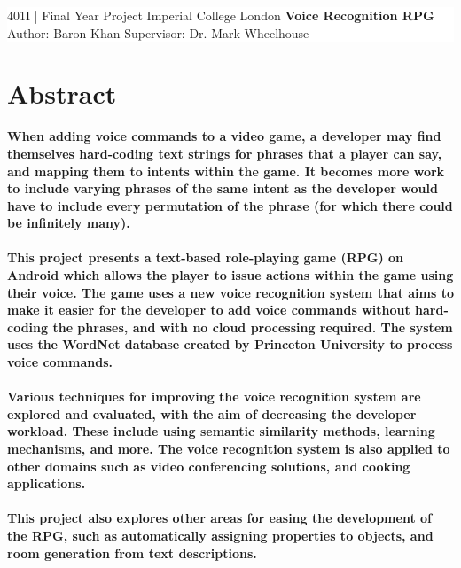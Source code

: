 \documentclass[11pt]{article}
\date{16 March 2017}
\begin{document}
\vspace*{6cm}
\colorbox{white}{
	\parbox[t]{1.0\linewidth}{
		\centering \fontsize{50pt}{80pt}\selectfont %
		\vspace*{0.7cm} %

		{401I | Final Year Project} \break
		\vspace*{0.7cm}
		Imperial College London
		\break
		\textbf{Voice Recognition RPG}
		\break
		Author: Baron Khan
		\vspace*{0.7cm} %
		\break
		Supervisor: Dr. Mark Wheelhouse
	}
}
\vfill %




\newpage
\thispagestyle{empty}
\tableofcontents
\newpage
\setcounter{page}{1}
\section{Abstract}

\textbf{When adding voice commands to a video game, a developer may find themselves hard-coding text strings for phrases that a player can say, and mapping them to intents within the game. It becomes more work to include varying phrases of the same intent as the developer would have to include every permutation of the phrase (for which there could be infinitely many).
\\
\\
This project presents a text-based role-playing game (RPG) on Android which allows the player to issue actions within the game using their voice. The game uses a new voice recognition system that aims to make it easier for the developer to add voice commands without hard-coding the phrases, and with no cloud processing required. The system uses the WordNet database created by Princeton University to process voice commands.
\\
\\
Various techniques for improving the voice recognition system are explored and evaluated, with the aim of decreasing the developer workload. These include using semantic similarity methods, learning mechanisms, and more. The voice recognition system is also applied to other domains such as video conferencing solutions, and cooking applications.
\\
\\
This project also explores other areas for easing the development of the RPG, such as automatically assigning properties to objects, and room generation from text descriptions.}
\end{document}
